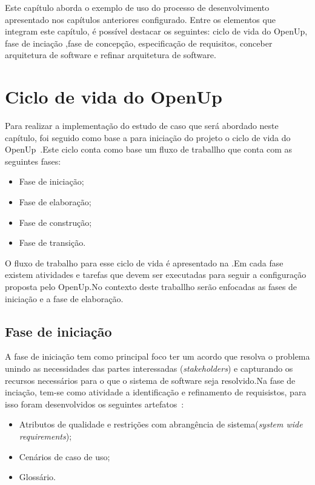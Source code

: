 Este capítulo aborda o exemplo de uso do processo de desenvolvimento apresentado nos capítulos anteriores configurado. Entre os elementos que integram este capítulo, é possível destacar os seguintes: ciclo de vida do OpenUp, fase de inciação ,fase de concepção, especificação de requisitos, conceber arquitetura de software e refinar arquitetura de software.

\section{Ciclo de vida do OpenUp}

Para realizar a implementação do estudo de caso que será abordado neste capítulo, foi seguido como base a para iniciação do projeto o ciclo de vida do OpenUp~\cite{openup}.Este ciclo conta como base um fluxo de traballho que conta com as seguintes fases:
\begin{itemize}
    \item Fase de iniciação;
    \item Fase de elaboração;
    \item Fase de construção;
    \item Fase de transição.
\end{itemize}

%

O fluxo de trabalho para esse ciclo de vida é apresentado na .Em cada fase existem atividades e tarefas que devem ser executadas para seguir a configuração proposta pelo OpenUp.No contexto deste traballho serão enfocadas as fases de iniciação e a fase de elaboração.

\subsection{Fase de iniciação}

A fase de iniciação tem como principal foco ter um acordo que resolva o problema unindo as necessidades das partes interessadas (\emph{stakeholders}) e capturando os recursos necessários para o que o sistema de software seja resolvido.Na fase de inciação, tem-se como atividade a identificação e refinamento de requisistos, para isso foram desenvolvidos os seguintes artefatos~\cite{openup}:

\begin{itemize}
    \item Atributos de qualidade e restrições com abrangência de sistema(\emph{system wide requirements});
    \item Cenários de caso de uso;
    \item Glossário.
\end{itemize}

